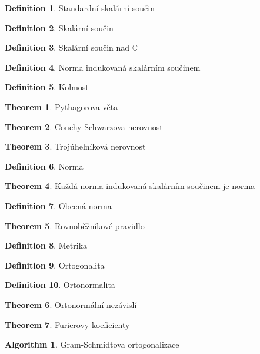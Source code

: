 \documentclass[a4paper]{article}
\theoremstyle{definition}
\newtheorem{definition}{Definition}
\newtheorem{theorem}{Theorem}
\newtheorem{algorithm}{Algorithm}
\begin{document}
\text{}\vspace{-0.1cm}
{\fontsize{12}{15}\selectfont \hspace{-0.5cm}}
\vspace{1cm}
\begin{definition}{Standardní skalární součin} \end{definition}
\begin{definition}{Skalární součin} \end{definition}
\begin{definition}{Skalární součin nad $\mathbb{C}$} \end{definition}
\begin{definition}{Norma indukovaná skalárním součinem} \end{definition}    
\begin{definition}{Kolmost} \end{definition}
\begin{theorem}{Pythagorova věta} \end{theorem}
\begin{theorem}{Couchy-Schwarzova nerovnost} \end{theorem}
\begin{theorem}{Trojúhelníková nerovnost} \end{theorem}
\begin{definition}{Norma} \end{definition}
\begin{theorem}{Každá norma indukovaná skalárním součinem je norma} \end{theorem}
\begin{definition}{Obecná norma} \end{definition}
\begin{theorem}{Rovnoběžníkové pravidlo} \end{theorem}
\begin{definition}{Metrika} \end{definition}
\begin{definition}{Ortogonalita} \end{definition}
\begin{definition}{Ortonormalita} \end{definition}
\begin{theorem}{Ortonormální nezávislí} \end{theorem}
\begin{theorem}{Furierovy koeficienty} \end{theorem}
\begin{algorithm}{Gram-Schmidtova ortogonalizace} \end{algorithm}
\end{document}
